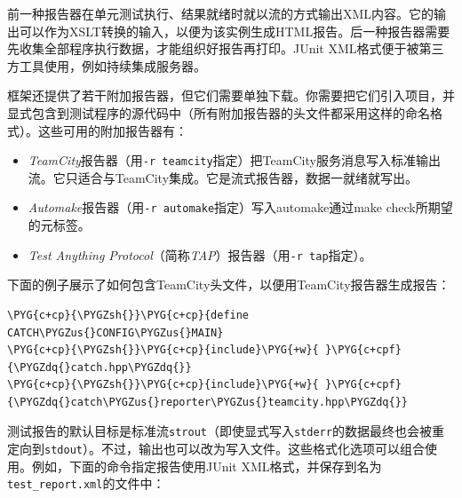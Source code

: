 
前一种报告器在单元测试执行、结果就绪时就以流的方式输出XML内容。它的输出可以作为XSLT转换的输入，以便为该实例生成HTML报告。后一种报告器需要先收集全部程序执行数据，才能组织好报告再打印。JUnit XML格式便于被第三方工具使用，例如持续集成服务器。



框架还提供了若干附加报告器，但它们需要单独下载。你需要把它们引入项目，并显式包含到测试程序的源代码中（所有附加报告器的头文件都采用这样的命名格式）。这些可用的附加报告器有：



\begin{itemize}
\item \textit{TeamCity}报告器（用\texttt{-\allowbreak{}r teamcity}指定）把TeamCity服务消息写入标准输出流。它只适合与TeamCity集成。它是流式报告器，数据一就绪就写出。



\item \textit{Automake}报告器（用\texttt{-\allowbreak{}r automake}指定）写入automake通过make check所期望的元标签。



\item \textit{Test Anything Protocol}（简称\textit{TAP}）报告器（用\texttt{-\allowbreak{}r tap}指定）。

\end{itemize}



下面的例子展示了如何包含TeamCity头文件，以便用TeamCity报告器生成报告：



\begin{codeblockbg}
\begin{Verbatim}[commandchars=\\\{\},breaklines=true,breakanywhere=true,fontsize=\codefont,xleftmargin=17bp]
\PYG{c+cp}{\PYGZsh{}}\PYG{c+cp}{define CATCH\PYGZus{}CONFIG\PYGZus{}MAIN}
\PYG{c+cp}{\PYGZsh{}}\PYG{c+cp}{include}\PYG{+w}{ }\PYG{c+cpf}{\PYGZdq{}catch.hpp\PYGZdq{}}
\PYG{c+cp}{\PYGZsh{}}\PYG{c+cp}{include}\PYG{+w}{ }\PYG{c+cpf}{\PYGZdq{}catch\PYGZus{}reporter\PYGZus{}teamcity.hpp\PYGZdq{}}
\end{Verbatim}
\end{codeblockbg}



测试报告的默认目标是标准流\texttt{strout}（即使显式写入\texttt{stderr}的数据最终也会被重定向到\texttt{stdout}）。不过，输出也可以改为写入文件。这些格式化选项可以组合使用。例如，下面的命令指定报告使用JUnit XML格式，并保存到名为\texttt{test\_\allowbreak{}report.\allowbreak{}xml}的文件中：


